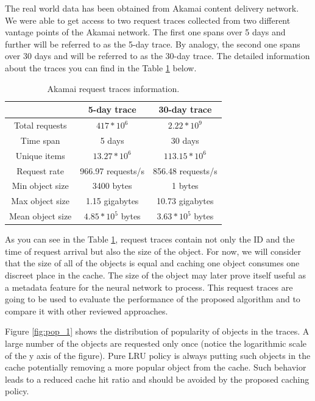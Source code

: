 The real world data has been obtained from Akamai content delivery network\cite{12}. We were able to get access to two request traces collected from two different vantage points of the Akamai network. The first one spans over 5 days and further will be referred to as the 5-day trace. By analogy, the second one spans over 30 days and will be referred to as the 30-day trace. The detailed information about the traces you can find in the Table \ref{table:1} below.

\begin{table}[h!]
	\centering
	\begin{tabular}{| c | c | c |}
		\hline
		& 5-day trace & 30-day trace \\
		\hline 
		Total requests & $ 417 * 10^6 $ & $ 2.22 * 10^9 $ \\ 
		Time span & 5 days & 30 days \\
		Unique items & $ 13.27 * 10^6 $ & $ 113.15 * 10^6 $ \\
		Request rate & 966.97 requests/s & 856.48 requests/s \\
		Min object size & 3400 bytes & 1 bytes \\
		Max object size & 1.15 gigabytes & 10.73 gigabytes \\ 
		Mean object size & $ 4.85 * 10^5 $ bytes & $ 3.63 * 10^5 $ bytes \\
		\hline
	\end{tabular}
	\caption{Akamai request traces information.}
	\label{table:1}
\end{table}

As you can see in the Table \ref{table:1}, request traces contain not only the ID and the time of request arrival but also the size of the object. For now, we will consider that the size of all of the objects is equal and caching one object consumes one discreet place in the cache. The size of the object may later prove itself useful as a metadata feature for the neural network to process. This request traces are going to be used to evaluate the performance of the proposed algorithm and to compare it with other reviewed approaches.

Figure \ref{fig:pop_1} shows the distribution of popularity of objects in the traces. A large number of the objects are requested only once (notice the logarithmic scale of the y axis of the figure). Pure LRU policy is always putting such objects in the cache potentially removing a more popular object from the cache. Such behavior leads to a reduced cache hit ratio and should be avoided by the proposed caching policy.